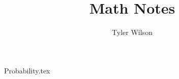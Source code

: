 \documentclass[11pt, fleqn]{article}
\title{Math Notes}
\author{Tyler Wilson}
\date{}
\begin{document}
\allowdisplaybreaks

\maketitle
\tableofcontents

{Probability.tex}
\end{document}
